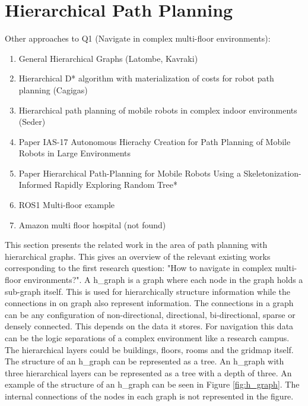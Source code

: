 \section{Hierarchical Path Planning}
\label{sec:hierarchical_planning}

Other approaches to Q1 (Navigate in complex multi-floor environments):
\begin{enumerate}
    \item General Hierarchical Graphs (Latombe, Kavraki)
    \item Hierarchical D* algorithm with materialization of costs for robot path planning (Cagigas)
    \item Hierarchical path planning of mobile robots in complex indoor environments (Seder)
    \item Paper IAS-17 Autonomous Hierachy Creation for Path Planning of Mobile Robots in Large Environments
    \item Paper Hierarchical Path-Planning for Mobile Robots Using a Skeletonization-Informed Rapidly Exploring Random Tree*
    \item ROS1 Multi-floor example
    \item Amazon multi floor hospital (not found)
\end{enumerate}

This section presents the related work in the area of path planning with hierarchical graphs. This gives an overview of the relevant existing works corresponding to the first research question: "How to navigate in complex multi-floor environments?". 
A \Gls{h_graph} is a graph where each node in the graph holds a sub-graph itself. This is used for hierarchically structure information while the connections in on graph also represent information. The connections in a graph can be any configuration of non-directional, directional, bi-directional, sparse or densely connected. This depends on the data it stores. For navigation this data can be the logic separations of a complex environment like a research campus. The hierarchical layers could be buildings, floors, rooms and the gridmap itself. The structure of an \gls{h_graph} can be represented as a tree. An \gls{h_graph} with three hierarchical layers can be represented as a tree with a depth of three. An example of the structure of an \gls{h_graph} can be seen in Figure \ref{fig:h_graph}. The internal connections of the nodes in each graph is not represented in the figure. 

